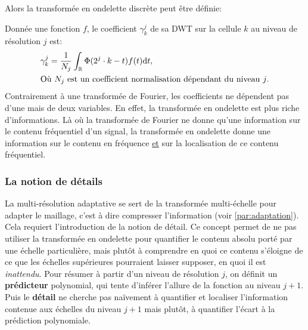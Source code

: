         Alors la transformée en ondelette discrète peut être définie:
        \begin{definition} Donnée une fonction $f$,
            le coefficient $\gamma_k^j$ de sa DWT sur la cellule $k$ au niveau de résolution $j$ est:
            \begin{align}
                &\gamma_k^j = \frac{1}{N_j} \int_\mathbb{R} \Phi(2^j\cdot k - t)f(t) \text{d} t,\\\notag
                &\text{Où $N_j$ est un coefficient normalisation dépendant du niveau $j$.}
            \end{align}
            Contrairement à une transformée de Fourier, les coefficients ne dépendent pas d'une mais de deux variables. En effet, 
            la transformée en ondelette est plus riche d'informations. Là où la transformée de Fourier ne donne qu'une information 
            sur le contenu fréquentiel d'un signal, la transformée en ondelette donne une information sur le contenu en fréquence \underline{et}
            sur la localisation de ce contenu fréquentiel.
        \end{definition}

    \subsubsection{La notion de détails}
        La multi-résolution adaptative se sert de la transformée multi-échelle pour adapter le maillage, c'est à dire compresser l'information (voir \ref{par:adaptation}).
        Cela requiert l'introduction de la notion de détail. Ce concept permet de ne pas utiliser la transformée en ondelette pour quantifier le contenu absolu porté par une échelle particulière,
        mais plutôt à comprendre en quoi ce contenu s'éloigne de ce que les échelles supérieures pourraient laisser supposer, en quoi il est \textit{inattendu}.
        Pour résumer à partir d'un niveau de résolution $j$, on définit un \textbf{prédicteur} polynomial, qui tente d'inférer l'allure de la fonction au niveau $j+1$.
        Puis le \textbf{détail} ne cherche pas naïvement à quantifier et localiser l'information contenue aux échelles du niveau $j+1$ mais plutôt, 
        à quantifier l'écart à la prédiction polynomiale.
